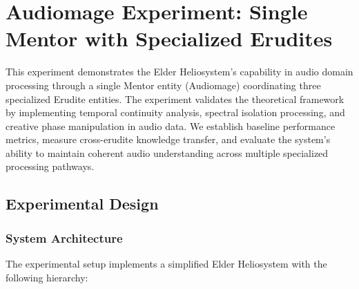 \chapter{Audiomage Experiment: Single Mentor with Specialized Erudites}

\begin{tcolorbox}[colback=DarkSkyBlue!5!white,colframe=DarkSkyBlue!75!black,title=Experiment Overview]
This experiment demonstrates the Elder Heliosystem's capability in audio domain processing through a single Mentor entity (Audiomage) coordinating three specialized Erudite entities. The experiment validates the theoretical framework by implementing temporal continuity analysis, spectral isolation processing, and creative phase manipulation in audio data. We establish baseline performance metrics, measure cross-erudite knowledge transfer, and evaluate the system's ability to maintain coherent audio understanding across multiple specialized processing pathways.
\end{tcolorbox}

\section{Experimental Design}

\subsection{System Architecture}

The experimental setup implements a simplified Elder Heliosystem with the following hierarchy:

